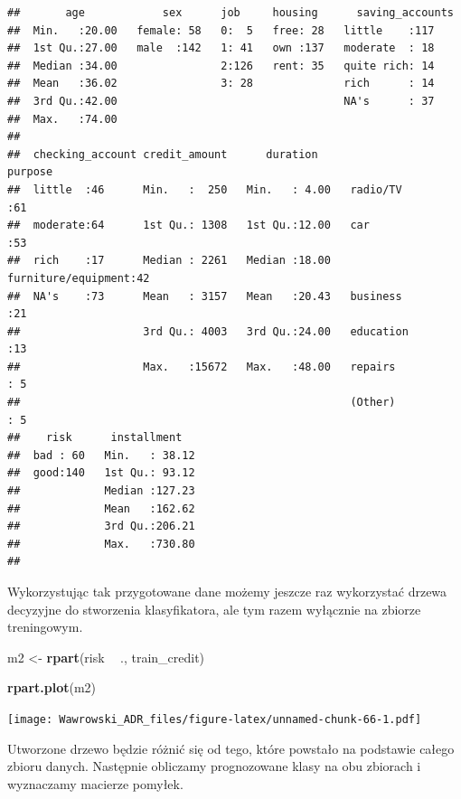 \documentclass[
]{book}
\newenvironment{Shaded}{\begin{snugshade}}{\end{snugshade}}
\newcommand{\KeywordTok}[1]{\textcolor[rgb]{0.13,0.29,0.53}{\textbf{#1}}}
\newcommand{\NormalTok}[1]{#1}
\newcommand{\OperatorTok}[1]{\textcolor[rgb]{0.81,0.36,0.00}{\textbf{#1}}}
\newcommand{\StringTok}[1]{\textcolor[rgb]{0.31,0.60,0.02}{#1}}
\begin{document}
\begin{verbatim}
##       age            sex      job     housing      saving_accounts
##  Min.   :20.00   female: 58   0:  5   free: 28   little    :117   
##  1st Qu.:27.00   male  :142   1: 41   own :137   moderate  : 18   
##  Median :34.00                2:126   rent: 35   quite rich: 14   
##  Mean   :36.02                3: 28              rich      : 14   
##  3rd Qu.:42.00                                   NA's      : 37   
##  Max.   :74.00                                                    
##                                                                   
##  checking_account credit_amount      duration                    purpose  
##  little  :46      Min.   :  250   Min.   : 4.00   radio/TV           :61  
##  moderate:64      1st Qu.: 1308   1st Qu.:12.00   car                :53  
##  rich    :17      Median : 2261   Median :18.00   furniture/equipment:42  
##  NA's    :73      Mean   : 3157   Mean   :20.43   business           :21  
##                   3rd Qu.: 4003   3rd Qu.:24.00   education          :13  
##                   Max.   :15672   Max.   :48.00   repairs            : 5  
##                                                   (Other)            : 5  
##    risk      installment    
##  bad : 60   Min.   : 38.12  
##  good:140   1st Qu.: 93.12  
##             Median :127.23  
##             Mean   :162.62  
##             3rd Qu.:206.21  
##             Max.   :730.80  
## 
\end{verbatim}

Wykorzystując tak przygotowane dane możemy jeszcze raz wykorzystać drzewa decyzyjne do stworzenia klasyfikatora, ale tym razem wyłącznie na zbiorze treningowym.

\begin{Shaded}
\begin{Highlighting}[]
\NormalTok{m2 <-}\StringTok{ }\KeywordTok{rpart}\NormalTok{(risk }\OperatorTok{~}\StringTok{ }\NormalTok{., train_credit)}

\KeywordTok{rpart.plot}\NormalTok{(m2)}
\end{Highlighting}
\end{Shaded}

\texttt{[image: Wawrowski\_ADR\_files/figure-latex/unnamed-chunk-66-1.pdf]}

Utworzone drzewo będzie różnić się od tego, które powstało na podstawie całego zbioru danych. Następnie obliczamy prognozowane klasy na obu zbiorach i wyznaczamy macierze pomyłek.
\end{document}
